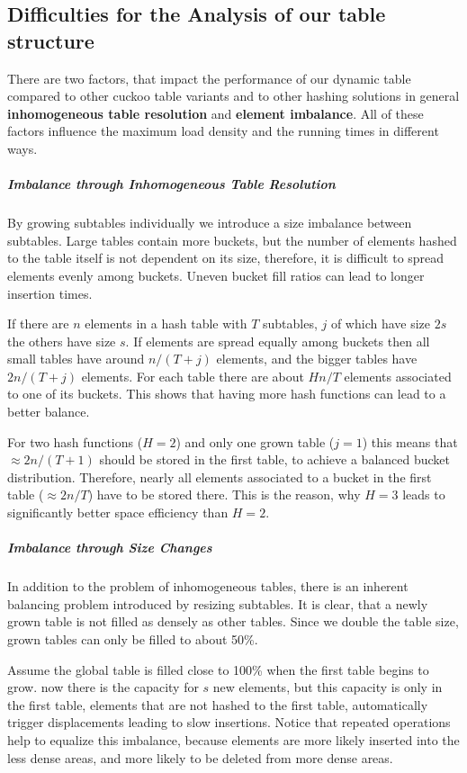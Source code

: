 \documentclass[a4paper,UKenglish]{lipics-v2016}
\begin{document}
\subsection{Difficulties for the Analysis of our table structure}
There are two factors, that impact the performance of our dynamic
table compared to other cuckoo table variants and to other hashing
solutions in general \textbf{inhomogeneous table resolution} and
\textbf{element imbalance}.
All of these factors influence the maximum load density and the
running times in different ways.

\subparagraph*{Imbalance through Inhomogeneous Table Resolution}
\label{sec:inhom_res}
By growing subtables individually we introduce a size imbalance
between subtables.  Large tables contain more buckets, but the number
of elements hashed to the table itself is not dependent on its size,
therefore, it is difficult to spread elements evenly among buckets.
Uneven bucket fill ratios can lead to longer insertion times.

If there are $n$ elements in a hash table with $T$ subtables,
$j$ of which have size $2s$ the others have size $s$. If elements are
spread equally among buckets then all small tables have around
$n/(T+j)$ elements, and the bigger tables have $2n/(T+j)$ elements.
For each table there are about $Hn/T$ elements associated to one of
its buckets.  This shows that having more hash functions can lead to a
better balance.

For two hash functions ($H=2$) and only one grown table ($j=1$) this
means that $\approx 2n/(T+1)$ should be stored in the first table, to
achieve a balanced bucket distribution.  Therefore, nearly all
elements associated to a bucket in the first table ($\approx 2n/T$)
have to be stored there.  This is the reason, why $H=3$ leads to
significantly better space efficiency than $H=2$.

\subparagraph*{Imbalance through Size Changes}
In addition to the problem of inhomogeneous tables, there is an
inherent balancing problem introduced by resizing subtables. It is
clear, that a newly grown table is not filled as densely as other
tables.  Since we double the table size, grown tables can only be
filled to about 50\%.

Assume the global table is filled close to 100\% when the first table
begins to grow.  now there is the capacity for $s$ new elements, but
this capacity is only in the first table, elements that are not hashed
to the first table, automatically trigger displacements leading to
slow insertions.  Notice that repeated operations help to equalize
this imbalance, because elements are more likely inserted into the
less dense areas, and more likely to be deleted from more dense areas.
\end{document}
